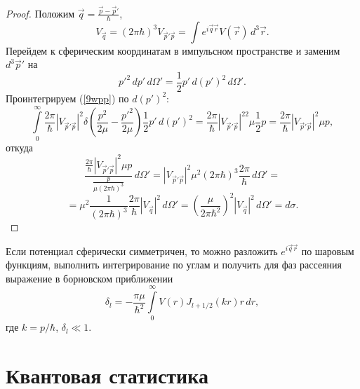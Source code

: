 \documentclass[a4paper
]{article}
\begin{document}
\begin{proof}
Положим $\vec q=\frac{\vec p-\vec p'}{\hbar}$,
$$V_{\vec q}=(2\pi \hbar)^3V_{\vec p'\vec p}=\int e^{i\vec q\vec r}
V(\vec r)\, d^3\vec r.$$ Перейдем к сферическим координатам в импульсном
пространстве и заменим $d^3\vec p'$ на
$$p'^2\, dp'\, d\Omega'=\frac12 p'\, d(p')^2\, d\Omega'.$$
Проинтегрируем (\ref{9wpp}) по $d(p')^2$:
$$\int \limits_0^\infty \frac{2\pi}{\hbar}|V_{\vec p'\vec p}|^2\delta
\left(\frac{p^2}{2\mu}-\frac{p'^2}{2\mu}\right)\frac12 p'\, d(p')^2=
\frac{2\pi}{\hbar}|V_{\vec p'\vec p}|^22\mu \frac12 p=\frac{2\pi}{\hbar}
|V_{\vec p'\vec p}|^2\mu p,$$ откуда $$\frac{\frac{2\pi}{\hbar}|V_{\vec
p'\vec p}|^2\mu p}{\frac{p}{\mu(2\pi\hbar)^3}}\, d\Omega'=|V_{\vec p'
\vec p}|^2\mu^2(2\pi\hbar)^3\frac{2\pi}{\hbar}\, d\Omega'=$$ $$=\mu^2
\frac{1}{(2\pi \hbar)^3}\frac{2\pi}{\hbar}|V_{\vec q}|^2\, d\Omega'=
\left(\frac{\mu}{2\pi\hbar^2}\right)^2|V_{\vec q}|^2\, d\Omega'=d\sigma.$$
\end{proof}
Если потенциал сферически симметричен, то можно разложить $e^{i\vec q
\vec r}$ по шаровым функциям, выполнить интегрирование по углам и
получить для фаз рассеяния выражение в борновском приближении
$$\delta_l=-\frac{\pi \mu}{\hbar^2}\int \limits_0^\infty V(r)J_{l+1/2}
(kr)r\, dr,$$ где $k=p/\hbar$, $\delta_l\ll 1$.
\section{Квантовая статистика}
\end{document}
